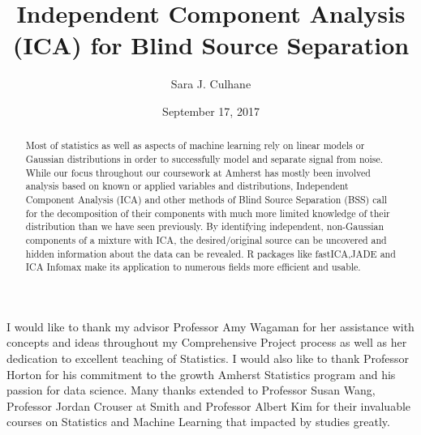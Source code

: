\documentclass[12pt,twoside]{amherstthesis}
\title{Independent Component Analysis (ICA) for Blind Source Separation}
\author{Sara J. Culhane}
\date{September 17, 2017}
\begin{document}
      \maketitle
  
  \frontmatter %
  \pagestyle{empty} %

      \begin{acknowledgements}
      I would like to thank my advisor Professor Amy Wagaman for her
      assistance with concepts and ideas throughout my Comprehensive Project
      process as well as her dedication to excellent teaching of Statistics. I
      would also like to thank Professor Horton for his commitment to the
      growth Amherst Statistics program and his passion for data science. Many
      thanks extended to Professor Susan Wang, Professor Jordan Crouser at
      Smith and Professor Albert Kim for their invaluable courses on
      Statistics and Machine Learning that impacted by studies greatly.
    \end{acknowledgements}
  
  

      \hypersetup{linkcolor=black}
    \setcounter{tocdepth}{2}
    \tableofcontents
  
      \listoftables
  
      \listoffigures
  
      \begin{abstract}
      Most of statistics as well as aspects of machine learning rely on linear
      models or Gaussian distributions in order to successfully model and
      separate signal from noise. While our focus throughout our coursework at
      Amherst has mostly been involved analysis based on known or applied
      variables and distributions, Independent Component Analysis (ICA) and
      other methods of Blind Source Separation (BSS) call for the
      decomposition of their components with much more limited knowledge of
      their distribution than we have seen previously. By identifying
      independent, non-Gaussian components of a mixture with ICA, the
      desired/original source can be uncovered and hidden information about
      the data can be revealed. R packages like fastICA,JADE and ICA Infomax
      make its application to numerous fields more efficient and usable.
    \end{abstract}
  
  
  \mainmatter %
  \pagestyle{fancyplain} %
\end{document}
